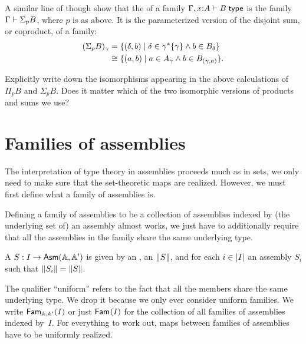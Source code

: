 A similar line of though show that the  of a family $\Gamma, x \of A \types B \istype$ is the family $\Gamma \types \Sigma_p B$, where $p$ is as above. It is the parameterized version of the disjoint sum, or coproduct, of a family:
%
\begin{align*}
  (\Sigma_p B)_\gamma &=
  \set{ (\delta, b) \such \delta \in \invim{\gamma} \set{\gamma} \land b \in B_\delta }
  \\
  &\cong
  \set{ (a, b) \such a \in A_\gamma \land b \in B_{(\gamma, a)}}.
\end{align*}

\begin{exercise}
  Explicitly write down the isomorphisms appearing in the above calculations
  of $\Pi_p B$ and $\Sigma_p B$. Does it matter which of the two isomorphic versions of products and sums we use?
\end{exercise}

\section{Families of assemblies}
\label{sec:families-assemblies}

The interpretation of type theory in assemblies proceeds much as in sets, we only need to make sure that the set-theoretic maps are realized. However, we must first define what a family of assemblies is.

Defining a family of assemblies to be a collection of assemblies indexed by (the underlying set of) an assembly almost works, we just have to additionally require that all the assemblies in the family share the same underlying type.

\begin{definition}
  A  $S : I \to \AsmA$ is given by an
  , an  $\T{S}$, and for each
  $i \in \S{I}$ an assembly $S_i$ such that $\T{S_i} = \T{S}$.
\end{definition}

The qualifier ``uniform'' refers to the fact that all the members share the same underlying type. We drop it because we only ever consider uniform families.
%
We write $\Fam[\AA, \subAA]{I}$ or just $\Fam{I}$ for the collection of all families of assemblies indexed by~$I$. For everything to work out, maps between families of assemblies have to be uniformly realized.

